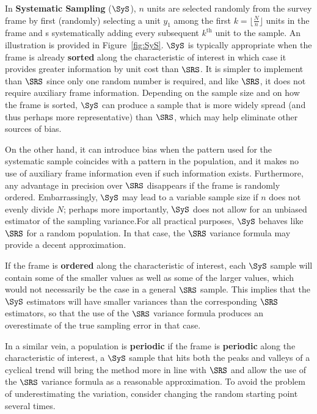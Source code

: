 In \textbf{Systematic Sampling} ($\SyS$), $n$ units are selected randomly from the survey frame by first (randomly) selecting a unit $y_1$ among the first $k=\lfloor\frac{N}{n}\rfloor$ units in the frame and s systematically adding every subsequent $k^{\textrm{th}}$ unit to the sample. An illustration is provided in Figure~\ref{fig:SyS}. \newl $\SyS$ is typically appropriate when the frame is already \textbf{sorted} along the characteristic of interest in which case it provides greater information by unit cost than $\SRS$. It is simpler to implement than $\SRS$ since only one random number is required, and like $\SRS$, it does not require auxiliary frame information. Depending on the sample size and on how the frame is sorted, $\SyS$ can produce a sample that is more widely spread (and thus perhaps more representative) than $\SRS$, which may help eliminate other sources of bias.\par On the other hand, it can introduce bias when the pattern used for the systematic sample coincides with a pattern in the population, and it makes no use of auxiliary frame information even if such information exists. Furthermore, any advantage in precision over $\SRS$ disappears if the frame is randomly ordered. Embarrassingly, $\SyS$ may lead to a variable sample size if $n$ does not evenly divide $N$; perhaps more importantly, $\SyS$ does not allow for an unbiased estimator of the sampling variance.\newl For all practical purposes, $\SyS$ behaves like $\SRS$ for a random population. In that case, the $\SRS$ variance  formula may provide a decent approximation. 
\par If the frame is \textbf{ordered} along the characteristic of interest, each $\SyS$ sample will contain some of the smaller values as well as some of the larger values, which would not necessarily be the case in a general $\SRS$ sample. This implies that the  $\SyS$ estimators will have smaller variances than the corresponding $\SRS$ estimators, so that the use of the $\SRS$ variance formula produces an overestimate of the true sampling error in that case. \par In a similar vein, a population is \textbf{periodic} if the frame is \textbf{periodic}  along the characteristic of interest, a $\SyS$ sample that hits both the peaks and valleys of a cyclical trend will bring the method more in line with $\SRS$ and allow the use of the $\SRS$ variance formula as a reasonable approximation. To avoid the problem of underestimating the variation, consider changing the random starting point several times.\newl 
